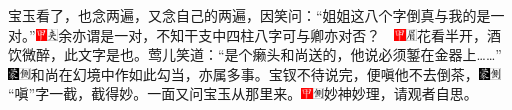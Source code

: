 宝玉看了，也念两遍，又念自己的两遍，因笑问：“姐姐这八个字倒真与我的是一对。”{\includegraphics[width=3mm]{../Images/00002}\includegraphics[width=3mm]{../Images/00012}\footnotesize \kaishu 余亦谓是一对，不知干支中四柱八字可与卿亦对否？　\includegraphics[width=3mm]{../Images/00002}\includegraphics[width=3mm]{../Images/00010}\footnotesize \kaishu 花看半开，酒饮微醉，此文字是也。}莺儿笑道：“是个癞头和尚送的，他说必须錾在金器上\ldots{}\ldots{}”{\includegraphics[width=3mm]{../Images/00006}\includegraphics[width=3mm]{../Images/00011}\footnotesize \kaishu 和尚在幻境中作如此勾当，亦属多事。}宝钗不待说完，便嗔他不去倒茶，{\includegraphics[width=3mm]{../Images/00006}\includegraphics[width=3mm]{../Images/00011}\footnotesize \kaishu “嗔”字一截，截得妙。}一面又问宝玉从那里来。{\includegraphics[width=3mm]{../Images/00002}\includegraphics[width=3mm]{../Images/00011}\footnotesize \kaishu 妙神妙理，请观者自思。}

